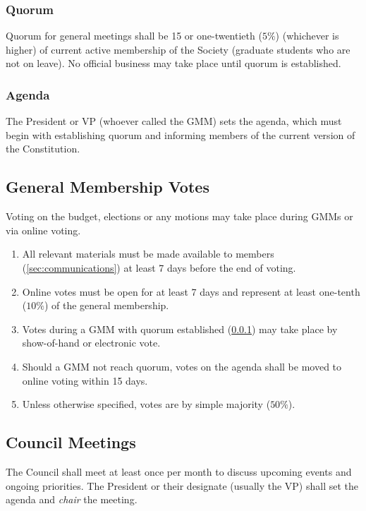 \subsubsection{Quorum}\label{sec:quorum}
Quorum for general meetings shall be 15 or one-twentieth ($5\%$) (whichever is
higher) of current active membership of the Society (graduate students who are
not on leave). No official business may take place until quorum is established.

\subsubsection{Agenda}
The President or VP (whoever called the GMM) sets the agenda, which must begin
with establishing quorum and informing members of the current version of the
Constitution.

\subsection{General Membership Votes}\label{sec:voting}
Voting on the budget, elections or any motions may take place during GMMs or
via online voting.

\begin{enumerate}
      \item All relevant materials must be made available to members
            (\ref{sec:communications}) at least 7 days before the end of voting.
      \item Online votes must be open for at least 7 days and represent at least one-tenth
            ($10\%$) of the general membership.
      \item Votes during a GMM with quorum established (\ref{sec:quorum}) may take place by
            show-of-hand or electronic vote.
      \item Should a GMM not reach quorum, votes on the agenda shall be moved to online
            voting within 15 days.
      \item Unless otherwise specified, votes are by simple majority ($50\%$).
\end{enumerate}

\subsection{Council Meetings}\label{sec:council-meetings}
The Council shall meet at least once per month to discuss upcoming events and
ongoing priorities. The President or their designate (usually the VP) shall set
the agenda and \textit{chair} the meeting.

